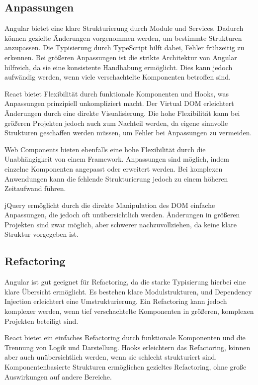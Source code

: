 \documentclass[oneside]{ausarbeitung}
\begin{document}
\subsection{Anpassungen}

Angular bietet eine klare Strukturierung durch Module und Services. Dadurch können gezielte Änderungen vorgenommen werden, um bestimmte Strukturen anzupassen. Die Typisierung durch TypeScript hilft dabei, Fehler frühzeitig zu erkennen. Bei größeren Anpassungen ist die strikte Architektur von Angular hilfreich, da sie eine konsistente Handhabung ermöglicht. Dies kann jedoch aufwändig werden, wenn viele verschachtelte Komponenten betroffen sind.

React bietet Flexibilität durch funktionale Komponenten und Hooks, was Anpassungen prinzipiell unkompliziert macht. Der Virtual DOM erleichtert Änderungen durch eine direkte Visualisierung. Die hohe Flexibilität kann bei größeren Projekten jedoch auch zum Nachteil werden, da eigene sinnvolle Strukturen geschaffen werden müssen, um Fehler bei Anpassungen zu vermeiden.

Web Components bieten ebenfalls eine hohe Flexibilität durch die Unabhängigkeit von einem Framework. Anpassungen sind möglich, indem einzelne Komponenten angepasst oder erweitert werden. Bei komplexen Anwendungen kann die fehlende Strukturierung jedoch zu einem höheren Zeitaufwand führen.

jQuery ermöglicht durch die direkte Manipulation des DOM einfache Anpassungen, die jedoch oft unübersichtlich werden. Änderungen in größeren Projekten sind zwar möglich, aber schwerer nachzuvollziehen, da keine klare Struktur vorgegeben ist.

\subsection{Refactoring}

Angular ist gut geeignet für Refactoring, da die starke Typisierung hierbei eine klare Übersicht ermöglicht. Es bestehen klare Modulstrukturen, und Dependency Injection erleichtert eine Umstrukturierung. Ein Refactoring kann jedoch komplexer werden, wenn tief verschachtelte Komponenten in größeren, komplexen Projekten beteiligt sind.

React bietet ein einfaches Refactoring durch funktionale Komponenten und die Trennung von Logik und Darstellung. Hooks erleichtern das Refactoring, können aber auch unübersichtlich werden, wenn sie schlecht strukturiert sind. Komponentenbasierte Strukturen ermöglichen gezieltes Refactoring, ohne große Auswirkungen auf andere Bereiche.
\end{document}
